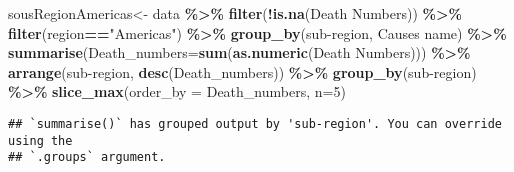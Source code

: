 \documentclass[
]{article}
\newenvironment{Shaded}{\begin{snugshade}}{\end{snugshade}}
\newcommand{\AttributeTok}[1]{\textcolor[rgb]{0.13,0.29,0.53}{#1}}
\newcommand{\DecValTok}[1]{\textcolor[rgb]{0.00,0.00,0.81}{#1}}
\newcommand{\FunctionTok}[1]{\textcolor[rgb]{0.13,0.29,0.53}{\textbf{#1}}}
\newcommand{\NormalTok}[1]{#1}
\newcommand{\OtherTok}[1]{\textcolor[rgb]{0.56,0.35,0.01}{#1}}
\newcommand{\SpecialCharTok}[1]{\textcolor[rgb]{0.81,0.36,0.00}{\textbf{#1}}}
\newcommand{\StringTok}[1]{\textcolor[rgb]{0.31,0.60,0.02}{#1}}
\begin{document}
\begin{Shaded}
\begin{Highlighting}[]
\NormalTok{sousRegionAmericas}\OtherTok{\textless{}{-}}\NormalTok{ data }\SpecialCharTok{\%\textgreater{}\%}
  \FunctionTok{filter}\NormalTok{(}\SpecialCharTok{!}\FunctionTok{is.na}\NormalTok{(}\StringTok{\textasciigrave{}}\AttributeTok{Death Numbers}\StringTok{\textasciigrave{}}\NormalTok{)) }\SpecialCharTok{\%\textgreater{}\%}
  \FunctionTok{filter}\NormalTok{(region}\SpecialCharTok{==}\StringTok{"Americas"}\NormalTok{) }\SpecialCharTok{\%\textgreater{}\%}
  \FunctionTok{group\_by}\NormalTok{(}\StringTok{\textasciigrave{}}\AttributeTok{sub{-}region}\StringTok{\textasciigrave{}}\NormalTok{, }\StringTok{\textasciigrave{}}\AttributeTok{Causes name}\StringTok{\textasciigrave{}}\NormalTok{) }\SpecialCharTok{\%\textgreater{}\%}
  \FunctionTok{summarise}\NormalTok{(}\AttributeTok{Death\_numbers=}\FunctionTok{sum}\NormalTok{(}\FunctionTok{as.numeric}\NormalTok{(}\StringTok{\textasciigrave{}}\AttributeTok{Death Numbers}\StringTok{\textasciigrave{}}\NormalTok{))) }\SpecialCharTok{\%\textgreater{}\%}
              \FunctionTok{arrange}\NormalTok{(}\StringTok{\textasciigrave{}}\AttributeTok{sub{-}region}\StringTok{\textasciigrave{}}\NormalTok{, }\FunctionTok{desc}\NormalTok{(Death\_numbers)) }\SpecialCharTok{\%\textgreater{}\%}
  \FunctionTok{group\_by}\NormalTok{(}\StringTok{\textasciigrave{}}\AttributeTok{sub{-}region}\StringTok{\textasciigrave{}}\NormalTok{) }\SpecialCharTok{\%\textgreater{}\%}
  \FunctionTok{slice\_max}\NormalTok{(}\AttributeTok{order\_by =}\NormalTok{ Death\_numbers, }\AttributeTok{n=}\DecValTok{5}\NormalTok{)}
\end{Highlighting}
\end{Shaded}

\begin{verbatim}
## `summarise()` has grouped output by 'sub-region'. You can override using the
## `.groups` argument.
\end{verbatim}
\end{document}
